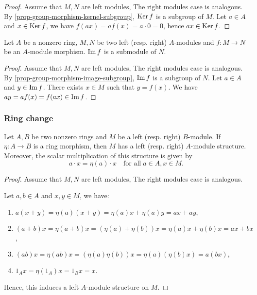 \documentclass[12pt]{report}
\begin{document}
\begin{proof}
    Assume that $M, N$ are left modules, The right modules case is analogous. By \ref{prop-group-morphism-kernel-subgroup}, $\operatorname{Ker} f$ is a subgroup of $M$. Let $a \in A$ and $x \in \operatorname{Ker} f$, we have $f(a x) = a f(x) = a \cdot 0 = 0$, hence $a x \in \operatorname{Ker} f$.
\end{proof}

\begin{proposition} \label{prop-module-morphism-image-submodule}
    Let $A$ be a nonzero ring, $M, N$ be two left (resp. right) $A$-modules and $f \colon M \to N$ be an $A$-module morphism. $\operatorname{Im} f$ is a submodule of $N$.
\end{proposition}

\begin{proof}
    Assume that $M, N$ are left modules, The right modules case is analogous. By \ref{prop-group-morphism-image-subgroup}, $\operatorname{Im} f$ is a subgroup of $N$. Let $a \in A$ and $y \in \operatorname{Im} f$. There exists $x \in M$ such that $y = f(x)$. We have $a y = a f(x) = f(a x) \in \operatorname{Im} f$.
\end{proof}

\subsubsection{Ring change}

\begin{proposition} \label{prop-module-ring-change}
    Let $A, B$ be two nonzero rings and $M$ be a left (resp. right) $B$-module. If $\eta \colon A \to B$ is a ring morphism, then $M$ has a left (resp. right) $A$-module structure. Moreover, the scalar multiplication of this structure is given by
    \[
        a \cdot x = \eta(a) \cdot x \quad \text{for all} \; a \in A, x \in M.
    \]
\end{proposition}

\begin{proof}
    Assume that $M, N$ are left modules, The right modules case is analogous. 
    
    Let $a, b \in A$ and $x, y \in M$, we have:
    \begin{enumerate}[label=(\roman*)]
        \item $a (x + y) = \eta(a) (x + y) = \eta(a) x + \eta(a) y = a x + a y$,
        \item $(a + b) x = \eta(a + b) x = (\eta(a) + \eta(b)) x = \eta(a) x + \eta(b) x = a x + b x $,
        \item $(a b) x = \eta(a b) x = (\eta(a) \eta(b)) x = \eta(a) (\eta(b) x) = a (b x)$,
        \item $1_{A} x = \eta(1_A) x = 1_B x = x$.
    \end{enumerate}
    Hence, this induces a left $A$-module structure on $M$.
\end{proof}
\end{document}
